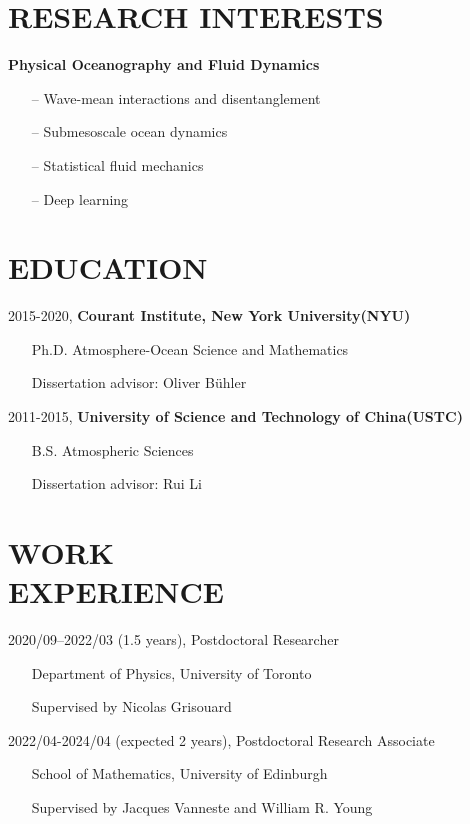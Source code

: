 \documentclass[margin]{res}
\begin{document}
\begin{resume}

\section{{\normalfont RESEARCH INTERESTS}}
\textbf{Physical Oceanography and Fluid Dynamics}
\begin{itemize}[leftmargin=*,noitemsep]
\item[--]{Wave-mean interactions and disentanglement}
\item[--]{Submesoscale ocean dynamics}
\item[--]{Statistical fluid mechanics}
\item[--]{Deep learning}
\end{itemize}

\section{{\normalfont EDUCATION}}
2015-2020, \textbf{Courant Institute, New York University(NYU)} 
\begin{itemize}[leftmargin=*,noitemsep]
\item[]{Ph.D. Atmosphere-Ocean Science and Mathematics}
\item[]{Dissertation advisor: Oliver B{\"u}hler}
\end{itemize}
\vspace*{-2.5mm}
2011-2015, \textbf{University of Science and Technology of China(USTC)} 
\begin{itemize}[leftmargin=*,noitemsep]
\item[]{B.S. Atmospheric Sciences}
\item[]{Dissertation advisor: Rui Li}
\end{itemize}

\section{{\normalfont WORK \\EXPERIENCE}}
2020/09--2022/03 (1.5 years), Postdoctoral Researcher
\begin{itemize}[leftmargin=*,noitemsep]
\item[]{Department of Physics, University of Toronto}
\item[]{Supervised by Nicolas Grisouard}
\end{itemize}
2022/04-2024/04 (expected 2 years), Postdoctoral Research Associate
\begin{itemize}[leftmargin=*,noitemsep]
\item[]{School of Mathematics, University of Edinburgh}
\item[]{Supervised by  Jacques Vanneste and William R. Young }
\end{itemize}


\end{resume}
\end{document}
